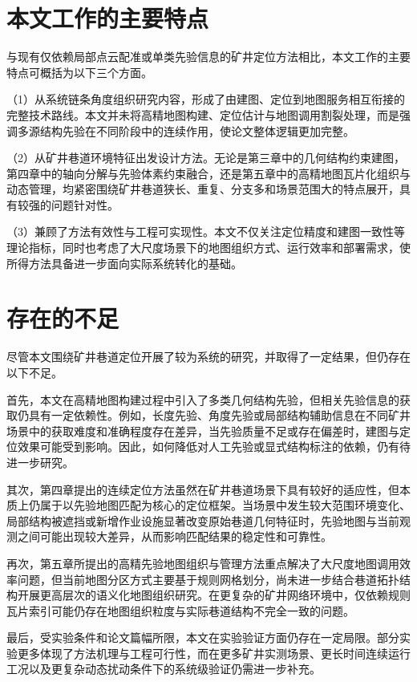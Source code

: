 \section{本文工作的主要特点}

与现有仅依赖局部点云配准或单类先验信息的矿井定位方法相比，本文工作的主要特点可概括为以下三个方面。

（1）从系统链条角度组织研究内容，形成了由建图、定位到地图服务相互衔接的完整技术路线。本文并未将高精地图构建、定位估计与地图调用割裂处理，而是强调多源结构先验在不同阶段中的连续作用，使论文整体逻辑更加完整。

（2）从矿井巷道环境特征出发设计方法。无论是第三章中的几何结构约束建图，第四章中的轴向分解与先验体素约束融合，还是第五章中的高精地图瓦片化组织与动态管理，均紧密围绕矿井巷道狭长、重复、分支多和场景范围大的特点展开，具有较强的问题针对性。

（3）兼顾了方法有效性与工程可实现性。本文不仅关注定位精度和建图一致性等理论指标，同时也考虑了大尺度场景下的地图组织方式、运行效率和部署需求，使所得方法具备进一步面向实际系统转化的基础。

\section{存在的不足}

尽管本文围绕矿井巷道定位开展了较为系统的研究，并取得了一定结果，但仍存在以下不足。

首先，本文在高精地图构建过程中引入了多类几何结构先验，但相关先验信息的获取仍具有一定依赖性。例如，长度先验、角度先验或局部结构辅助信息在不同矿井场景中的获取难度和准确程度存在差异，当先验质量不足或存在偏差时，建图与定位效果可能受到影响。因此，如何降低对人工先验或显式结构标注的依赖，仍有待进一步研究。

其次，第四章提出的连续定位方法虽然在矿井巷道场景下具有较好的适应性，但本质上仍属于以先验地图匹配为核心的定位框架。当场景中发生较大范围环境变化、局部结构被遮挡或新增作业设施显著改变原始巷道几何特征时，先验地图与当前观测之间可能出现较大差异，从而影响匹配结果的稳定性和可靠性。

再次，第五章所提出的高精先验地图组织与管理方法重点解决了大尺度地图调用效率问题，但当前地图分区方式主要基于规则网格划分，尚未进一步结合巷道拓扑结构开展更高层次的语义化地图组织研究。在更复杂的矿井网络环境中，仅依赖规则瓦片索引可能仍存在地图组织粒度与实际巷道结构不完全一致的问题。

最后，受实验条件和论文篇幅所限，本文在实验验证方面仍存在一定局限。部分实验更多体现了方法机理与工程可行性，而在更多矿井实测场景、更长时间连续运行工况以及更复杂动态扰动条件下的系统级验证仍需进一步补充。

